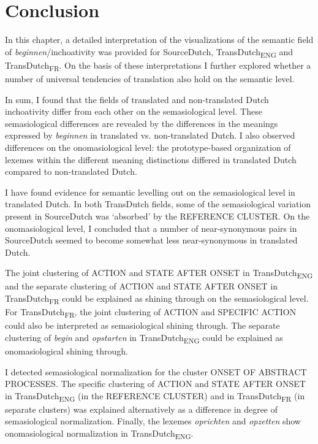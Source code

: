 \section{Conclusion}
\label{sec:4.8}  
In this chapter, a detailed interpretation of the visualizations of the semantic field of \textit{beginnen}/inchoativity was provided for SourceDutch, TransDutch\textsubscript{ENG} and TransDutch\textsubscript{FR}. On the basis of these interpretations I further explored whether a number of universal tendencies of translation also hold on the semantic level. 

In sum, I found that the fields of translated and non-translated Dutch inchoativity differ from each other on the semasiological level. These semasiological differences are revealed by the differences in the meanings expressed by \textit{beginnen} in translated vs. non-translated Dutch. I also observed differences on the onomasiological level: the prototype-based organization of lexemes within the different meaning distinctions differed in translated Dutch compared to non-translated Dutch.

I have found evidence for semantic levelling out on the semasiological level in translated Dutch. In both TransDutch fields, some of the semasiological variation present in SourceDutch was ‘absorbed’ by the REFERENCE CLUSTER. On the onomasiological level, I concluded that a number of near-synonymous pairs in SourceDutch seemed to become somewhat less near-synonymous in translated Dutch.

The joint clustering of ACTION and STATE AFTER ONSET in TransDutch\textsubscript{ENG} and the separate clustering of ACTION and STATE AFTER ONSET in TransDutch\textsubscript{FR} could be explained as shining through on the semasiological level. For TransDutch\textsubscript{FR}, the joint clustering of ACTION and {SPECIFIC} ACTION could also be interpreted as semasiological shining through. The separate clustering of \textit{begin} and \textit{opstarten} in TransDutch\textsubscript{ENG} could be explained as onomasiological shining through.

I detected semasiological normalization for the cluster {ONSET OF ABSTRACT PROCESSES}. The specific clustering of ACTION and STATE AFTER ONSET in TransDutch\textsubscript{ENG} (in the REFERENCE CLUSTER) and in TransDutch\textsubscript{FR} (in separate clusters) was explained alternatively as a difference in degree of semasiological normalization. Finally, the lexemes \textit{oprichten} and \textit{opzetten} show onomasiological normalization in TransDutch\textsubscript{ENG}.

